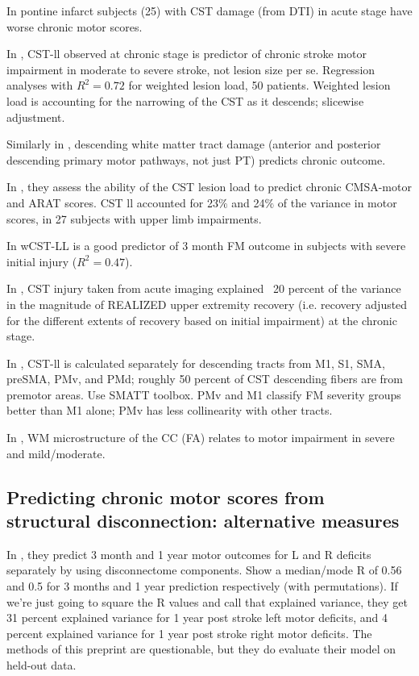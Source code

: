 \documentclass[10pt]{article}
\begin{document}
In \cite{Jang2008-ns} pontine infarct subjects (25) with CST damage (from DTI) in acute stage have worse chronic motor scores. 

In \cite{Zhu2010-qh}, CST-ll observed at chronic stage is predictor of chronic stroke motor impairment in moderate to severe stroke, not lesion size per se. Regression analyses with $R^2 = 0.72$ for weighted lesion load, 50 patients. Weighted lesion load is accounting for the narrowing of the CST as it descends; slicewise adjustment. 

Similarly in \cite{Lindenberg2010-pa}, descending white matter tract damage (anterior and posterior descending primary motor pathways, not just PT) predicts chronic outcome.

In \cite{Lam2018-xh}, they assess the ability of the CST lesion load to predict chronic CMSA-motor and ARAT scores. CST ll accounted for 23$\%$ and 24$\%$ of the variance in motor scores, in 27 subjects with upper limb impairments.

In \cite{Feng2015-du} wCST-LL is a good predictor of 3 month FM outcome in subjects with severe initial injury ($R^2 = 0.47$).

In \cite{Lin2019-hy}, CST injury taken from acute imaging explained ~20 percent of the variance in the magnitude of REALIZED upper extremity recovery (i.e. recovery adjusted for the different extents of recovery based on initial impairment) at the chronic stage.

In \cite{Ito2022-em}, CST-ll is calculated separately for descending tracts from M1, S1, SMA, preSMA, PMv, and PMd; roughly 50 percent of CST descending fibers are from premotor areas. Use SMATT toolbox. PMv and M1 classify FM severity groups better than M1 alone; PMv has less collinearity with other tracts.

In \cite{Hayward2022-hv}, WM microstructure of the CC (FA) relates to motor impairment in severe and mild/moderate. 

\subsection*{Predicting chronic motor scores from structural disconnection: alternative measures}
In \cite{Dulyan2021-jf}, they predict 3 month and 1 year motor outcomes for L and R deficits separately by using disconnectome components. Show a median/mode R of 0.56 and 0.5 for 3 months and 1 year prediction respectively (with permutations). If we're just going to square the R values and call that explained variance, they get 31 percent explained variance for 1 year post stroke left motor deficits, and 4 percent explained variance for 1 year post stroke right motor deficits. The methods of this preprint are questionable, but they do evaluate their model on held-out data.
\end{document}
